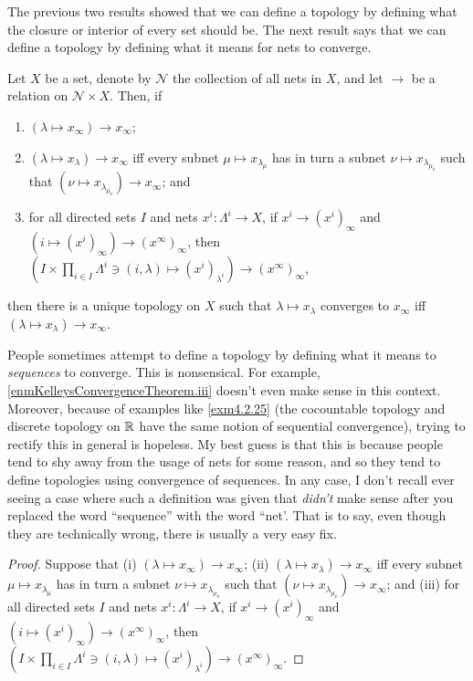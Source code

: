 The previous two results showed that we can define a topology by defining what the closure or interior of every set should be.  The next result says that we can define a topology by defining what it means for nets to converge.
\begin{thm}\label{KelleysConvergenceTheorem}
Let $X$ be a set, denote by $\mathcal{N}$ the collection of all nets in $X$, and let $\to$ be a relation on $\mathcal{N}\times X$.  Then, if
\begin{enumerate}
\item \label{enmKelleysConvergenceTheorem.i}$(\lambda \mapsto x_\infty)\to x_\infty$;
\item \label{enmKelleysConvergenceTheorem.ii}$(\lambda \mapsto x_\lambda )\to x_\infty$ iff every subnet $\mu \mapsto x_{\lambda _\mu}$ has in turn a subnet $\nu \mapsto x_{\lambda _{\mu _\nu}}$ such that $(\nu \mapsto x_{\lambda _{\mu _\nu}})\to x_\infty$; and
\item \label{enmKelleysConvergenceTheorem.iii} for all directed sets $I$ and nets $x^i:\Lambda ^i\rightarrow X$, if $x^i\to (x^i)_\infty$ and $(i\mapsto (x^i)_\infty )\to (x^\infty )_\infty$, then $\left( I\times \prod _{i\in I}\Lambda ^i\ni (i,\lambda )\mapsto (x^i)_{\lambda ^i}\right) \to (x^\infty )_\infty$,
\end{enumerate}
then there is a unique topology on $X$ such that $\lambda \mapsto x_\lambda$ converges to $x_\infty$ iff $(\lambda \mapsto x_\lambda )\to x_\infty$.
\begin{rmk}
People sometimes attempt to define a topology by defining what it means to \emph{sequences} to converge.  This is nonsensical.  For example, \ref{enmKelleysConvergenceTheorem.iii} doesn't even make sense in this context.  Moreover, because of examples like \cref{exm4.2.25} (the cocountable topology and discrete topology on $\mathbb{R}$ have the same notion of sequential convergence), trying to rectify this in general is hopeless.  My best guess is that this is because people tend to shy away from the usage of nets for some reason, and so they tend to define topologies using convergence of sequences.  In any case, I don't recall ever seeing a case where such a definition was given that \emph{didn't} make sense after you replaced the word ``sequence'' with the word ``net'.  That is to say, even though they are technically wrong, there is usually a very easy fix.
\end{rmk}
\begin{proof}
Suppose that (i) $(\lambda \mapsto x_\infty)\to x_\infty$; (ii) $(\lambda \mapsto x_\lambda )\to x_\infty$ iff every subnet $\mu \mapsto x_{\lambda _\mu}$ has in turn a subnet $\nu \mapsto x_{\lambda _{\mu _\nu}}$ such that $(\nu \mapsto x_{\lambda _{\mu _\nu}})\to x_\infty$; and (iii) for all directed sets $I$ and nets $x^i:\Lambda ^i\rightarrow X$, if $x^i\to (x^i)_\infty$ and $(i\mapsto (x^i)_\infty )\to (x^\infty )_\infty$, then $\left( I\times \prod _{i\in I}\Lambda ^i\ni (i,\lambda )\mapsto (x^i)_{\lambda ^i}\right) \to (x^\infty )_\infty$.


\end{proof}
\end{thm}
